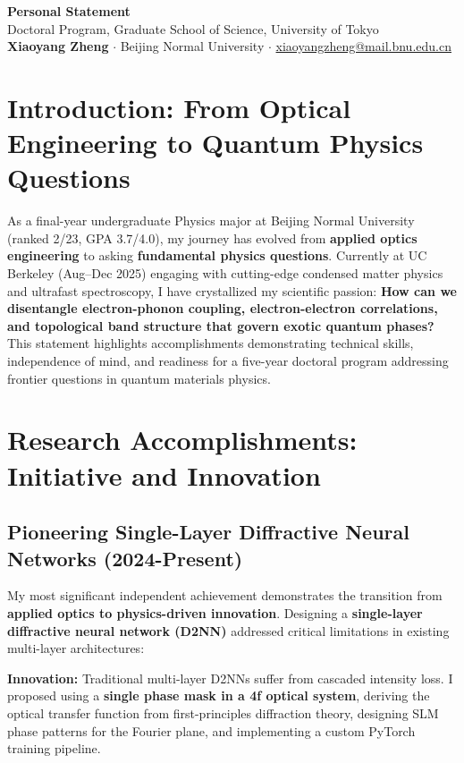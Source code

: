 \documentclass[11pt,a4paper]{article}
\begin{document}
\begin{center}
    {\large \textbf{Personal Statement}}\\[0.2em]
    {\normalsize Doctoral Program, Graduate School of Science, University of Tokyo}\\[0.4em]
    \textbf{Xiaoyang Zheng} $\cdot$ Beijing Normal University $\cdot$ \href{mailto:xiaoyangzheng@mail.bnu.edu.cn}{xiaoyangzheng@mail.bnu.edu.cn}
\end{center}

\vspace{-0.4em}

\section{Introduction: From Optical Engineering to Quantum Physics Questions}

As a final-year undergraduate Physics major at Beijing Normal University (ranked 2/23, GPA 3.7/4.0), my journey has evolved from \textbf{applied optics engineering} to asking \textbf{fundamental physics questions}. Currently at UC Berkeley (Aug--Dec 2025) engaging with cutting-edge condensed matter physics and ultrafast spectroscopy, I have crystallized my scientific passion: \textbf{How can we disentangle electron-phonon coupling, electron-electron correlations, and topological band structure that govern exotic quantum phases?} This statement highlights accomplishments demonstrating technical skills, independence of mind, and readiness for a five-year doctoral program addressing frontier questions in quantum materials physics.

\section{Research Accomplishments: Initiative and Innovation}

\subsection{Pioneering Single-Layer Diffractive Neural Networks (2024-Present)}

My most significant independent achievement demonstrates the transition from \textbf{applied optics to physics-driven innovation}. Designing a \textbf{single-layer diffractive neural network (D2NN)} addressed critical limitations in existing multi-layer architectures:

\textbf{Innovation:} Traditional multi-layer D2NNs suffer from cascaded intensity loss. I proposed using a \textbf{single phase mask in a 4f optical system}, deriving the optical transfer function from first-principles diffraction theory, designing SLM phase patterns for the Fourier plane, and implementing a custom PyTorch training pipeline.
\end{document}
